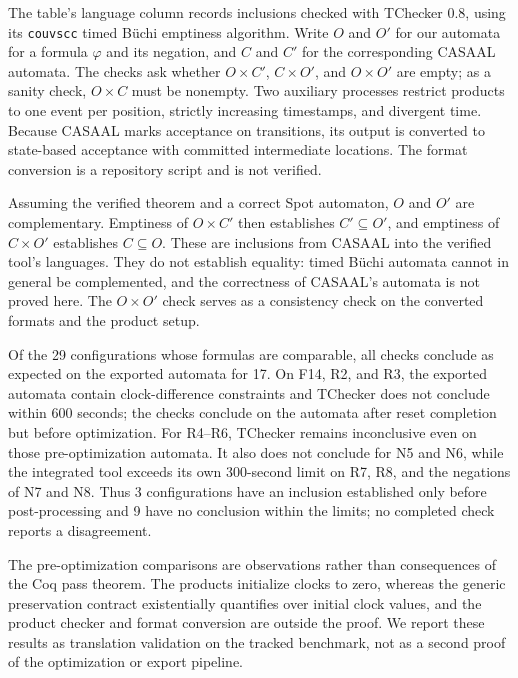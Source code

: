 \label{sec:cross-tool}
The table's language column records inclusions checked with TChecker 0.8,
using its \texttt{couvscc} timed B\"uchi emptiness algorithm. Write $O$ and
$O'$ for our automata for a formula $\varphi$ and its negation, and $C$ and
$C'$ for the corresponding CASAAL automata. The checks ask whether
$O\times C'$, $C\times O'$, and $O\times O'$ are empty; as a sanity check,
$O\times C$ must be nonempty. Two auxiliary processes restrict products to
one event per position, strictly increasing timestamps, and divergent time.
Because CASAAL marks acceptance on transitions, its output is converted to
state-based acceptance with committed intermediate locations. The format
conversion is a repository script and is not verified.

Assuming the verified theorem and a correct Spot automaton, $O$ and $O'$ are
complementary. Emptiness of $O\times C'$ then establishes $C'\subseteq O'$, and
emptiness of $C\times O'$ establishes $C\subseteq O$. These are inclusions
from CASAAL into the verified tool's languages. They do not establish
equality: timed B\"uchi automata cannot in general be complemented, and the
correctness of CASAAL's automata is not proved here. The $O\times O'$ check
serves as a consistency check on the converted formats and the product setup.

Of the 29 configurations whose formulas are comparable, all checks conclude
as expected on the exported automata for 17. On F14, R2, and R3, the exported
automata contain clock-difference constraints and TChecker does not conclude
within 600 seconds; the checks conclude on the automata after reset
completion but before optimization. For R4--R6, TChecker remains inconclusive
even on those pre-optimization automata. It also does not conclude for N5 and
N6, while the integrated tool exceeds its own 300-second limit on R7, R8,
and the negations of N7 and N8. Thus 3 configurations have an inclusion
established only before post-processing and 9 have no conclusion within the
limits; no completed check reports a disagreement.

The pre-optimization comparisons are observations rather than consequences
of the Coq pass theorem. The products initialize clocks to zero, whereas the
generic preservation contract existentially quantifies over initial clock
values, and the product checker and format conversion are outside the proof.
We report these results as translation validation on the tracked benchmark,
not as a second proof of the optimization or export pipeline.
